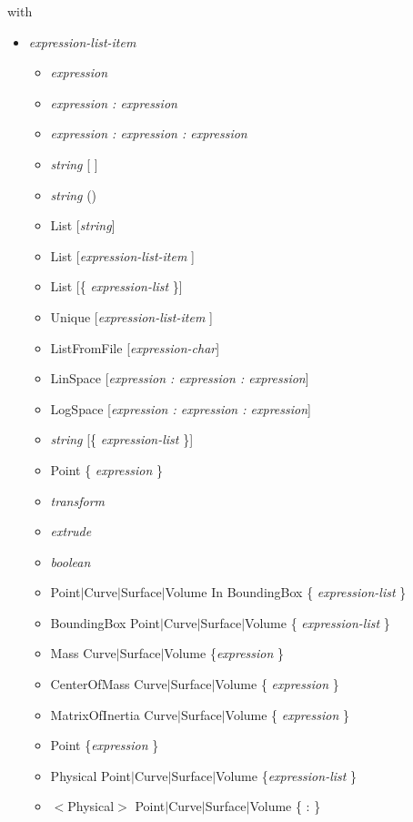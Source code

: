 \documentclass[dvipdfmx, 9pt, a4paper]{article}
\numberwithin{equation}{section}
\begin{document}
with
\begin{itemize}
\item {\it expression-list-item}
\begin{itemize}
\item {\it expression}
\item {\it expression : expression}
\item {\it expression : expression : expression}
\item {\it string} [ ]
\item {\it string} ()
\item List [{\it string}]
\item List [{\it expression-list-item }]
\item List [\{ {\it expression-list } \}]
\item Unique [{\it expression-list-item} ]
\item ListFromFile [{\it expression-char}]
\item LinSpace [{\it expression : expression : expression}]
\item LogSpace [{\it expression : expression : expression}]
\item {\it string} [\{ {\it expression-list} \}]
\item Point \{ {\it expression} \}
\item {\it transform}
\item {\it extrude}
\item {\it boolean}
\item Point$|$Curve$|$Surface$|$Volume In BoundingBox \{ {\it expression-list }\}
\item BoundingBox Point$|$Curve$|$Surface$|$Volume \{ {\it expression-list } \}
\item Mass Curve$|$Surface$|$Volume \{{\it expression} \}
\item CenterOfMass Curve$|$Surface$|$Volume \{ {\it expression } \}
\item MatrixOfInertia Curve$|$Surface$|$Volume \{ {\it expression }\}
\item Point \{{\it expression }\}
\item Physical Point$|$Curve$|$Surface$|$Volume \{{\it expression-list }\}
\item $<$Physical$>$ Point$|$Curve$|$Surface$|$Volume \{ : \}
\end{itemize}
\end{itemize}
\end{document}
